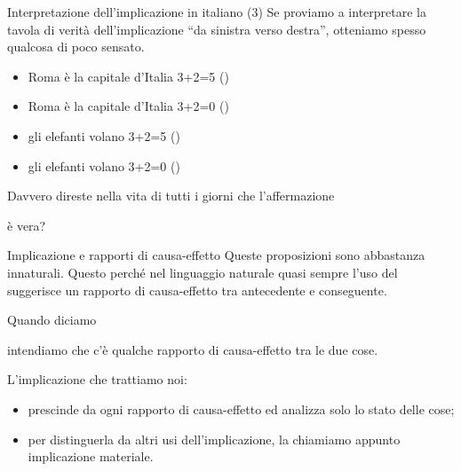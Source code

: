 \documentclass[aspectratio=169,10pt,dvipsnames,handout]{beamer}
\begin{document}
\begin{frame}{Interpretazione dell'implicazione in italiano (3)}
    Se proviamo a interpretare la tavola di verità dell'implicazione ``da sinistra verso destra'', otteniamo spesso qualcosa di poco sensato.

    \medskip
    \begin{example}
        \begin{itemize}
            \propshape
            \item {} Roma è la capitale d'Italia  3+2=5 \pause (\checkmark)
                  \pause
            \item {} Roma è la capitale d'Italia  3+2=0 \pause (\xmark)
                  \pause
            \item {} gli elefanti volano  3+2=5 \pause (\checkmark)
                  \pause
            \item {} gli elefanti volano  3+2=0 \pause (\checkmark)
        \end{itemize}
    \end{example}

    \medskip\pause
    Davvero direste nella vita di tutti i giorni che l'affermazione
    \begin{center}
    \end{center}
    è vera?
\end{frame}

\begin{frame}{Implicazione e rapporti di causa-effetto}
    Queste proposizioni sono abbastanza innaturali. Questo perché nel linguaggio naturale quasi sempre l'uso del  suggerisce un rapporto di causa-effetto tra antecedente e conseguente.
    \begin{example}
        Quando diciamo\\
        \begin{center}
        \end{center}
        intendiamo che c'è qualche rapporto di causa-effetto tra le due cose.
    \end{example}

    \medskip
    L'implicazione che trattiamo noi:
    \begin{itemize}
        \item prescinde da ogni rapporto di causa-effetto ed analizza solo lo stato delle cose;
        \item per distinguerla da altri usi dell'implicazione, la chiamiamo appunto \alert{implicazione materiale}.
    \end{itemize}
\end{frame}
\end{document}
